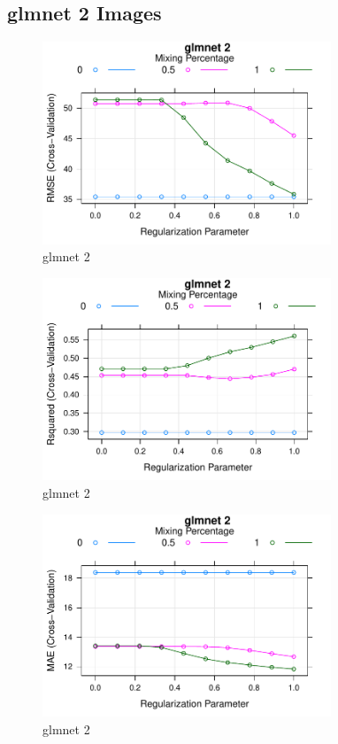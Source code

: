 
\subsection{glmnet 2 Images} 
 

\begin{figure} 
\centering  
\includegraphics[width=0.77\textwidth]{Code_Outputs/ML_report_task_2glmnet_RMSEvNVariables.pdf} 
\caption{\label{fig:ML_report_task_2glmnetRMSEvNVariables}glmnet 2} 
\end{figure} 
 

\begin{figure} 
\centering  
\includegraphics[width=0.77\textwidth]{Code_Outputs/ML_report_task_2glmnet_RsquaredvNVariables.pdf} 
\caption{\label{fig:ML_report_task_2glmnetRsquaredvNVariables}glmnet 2} 
\end{figure} 
 

\begin{figure} 
\centering  
\includegraphics[width=0.77\textwidth]{Code_Outputs/ML_report_task_2glmnet_MAEvNVariables.pdf} 
\caption{\label{fig:ML_report_task_2glmnetMAEvNVariables}glmnet 2} 
\end{figure} 
 
